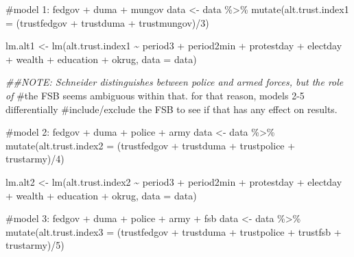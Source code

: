 \documentclass[
  letterpaper,
  DIV=11,
  numbers=noendperiod]{scrartcl}
\newenvironment{Shaded}{\begin{snugshade}}{\end{snugshade}}
\newcommand{\AttributeTok}[1]{\textcolor[rgb]{0.40,0.45,0.13}{#1}}
\newcommand{\CommentTok}[1]{\textcolor[rgb]{0.37,0.37,0.37}{#1}}
\newcommand{\DecValTok}[1]{\textcolor[rgb]{0.68,0.00,0.00}{#1}}
\newcommand{\DocumentationTok}[1]{\textcolor[rgb]{0.37,0.37,0.37}{\textit{#1}}}
\newcommand{\FunctionTok}[1]{\textcolor[rgb]{0.28,0.35,0.67}{#1}}
\newcommand{\NormalTok}[1]{\textcolor[rgb]{0.00,0.23,0.31}{#1}}
\newcommand{\OtherTok}[1]{\textcolor[rgb]{0.00,0.23,0.31}{#1}}
\newcommand{\SpecialCharTok}[1]{\textcolor[rgb]{0.37,0.37,0.37}{#1}}
\begin{document}
\begin{Shaded}
\begin{Highlighting}[]
\CommentTok{\#model 1: fedgov + duma + mungov}
\NormalTok{data }\OtherTok{\textless{}{-}}\NormalTok{ data }\SpecialCharTok{\%\textgreater{}\%} 
  \FunctionTok{mutate}\NormalTok{(}\AttributeTok{alt.trust.index1 =}\NormalTok{ (trustfedgov }\SpecialCharTok{+}\NormalTok{ trustduma }\SpecialCharTok{+}\NormalTok{ trustmungov)}\SpecialCharTok{/}\DecValTok{3}\NormalTok{)}

\NormalTok{lm.alt1 }\OtherTok{\textless{}{-}} \FunctionTok{lm}\NormalTok{(alt.trust.index1 }\SpecialCharTok{\textasciitilde{}}\NormalTok{ period3 }\SpecialCharTok{+}\NormalTok{ period2min }\SpecialCharTok{+}\NormalTok{ protestday }\SpecialCharTok{+}\NormalTok{ electday }\SpecialCharTok{+}
\NormalTok{                  wealth }\SpecialCharTok{+}\NormalTok{ education }\SpecialCharTok{+}\NormalTok{ okrug, }\AttributeTok{data =}\NormalTok{ data)}

\DocumentationTok{\#\#NOTE: Schneider distinguishes between police and armed forces, but the role of}
\CommentTok{\#the FSB seems ambiguous within that. for that reason, models 2{-}5 differentially}
\CommentTok{\#include/exclude the FSB to see if that has any effect on results.}

\CommentTok{\#model 2: fedgov + duma + police + army}
\NormalTok{data }\OtherTok{\textless{}{-}}\NormalTok{ data }\SpecialCharTok{\%\textgreater{}\%} 
  \FunctionTok{mutate}\NormalTok{(}\AttributeTok{alt.trust.index2 =}\NormalTok{ (trustfedgov }\SpecialCharTok{+}\NormalTok{ trustduma }\SpecialCharTok{+}\NormalTok{ trustpolice }\SpecialCharTok{+}\NormalTok{ trustarmy)}\SpecialCharTok{/}\DecValTok{4}\NormalTok{)}

\NormalTok{lm.alt2 }\OtherTok{\textless{}{-}} \FunctionTok{lm}\NormalTok{(alt.trust.index2 }\SpecialCharTok{\textasciitilde{}}\NormalTok{ period3 }\SpecialCharTok{+}\NormalTok{ period2min }\SpecialCharTok{+}\NormalTok{ protestday }\SpecialCharTok{+}\NormalTok{ electday }\SpecialCharTok{+}
\NormalTok{                  wealth }\SpecialCharTok{+}\NormalTok{ education }\SpecialCharTok{+}\NormalTok{ okrug, }\AttributeTok{data =}\NormalTok{ data)}

\CommentTok{\#model 3: fedgov + duma + police + army + fsb}
\NormalTok{data }\OtherTok{\textless{}{-}}\NormalTok{ data }\SpecialCharTok{\%\textgreater{}\%} 
  \FunctionTok{mutate}\NormalTok{(}\AttributeTok{alt.trust.index3 =}\NormalTok{ (trustfedgov }\SpecialCharTok{+}\NormalTok{ trustduma }\SpecialCharTok{+}\NormalTok{ trustpolice }\SpecialCharTok{+}\NormalTok{ trustfsb }\SpecialCharTok{+}
\NormalTok{                               trustarmy)}\SpecialCharTok{/}\DecValTok{5}\NormalTok{)}


\end{Highlighting}
\end{Shaded}
\end{document}
